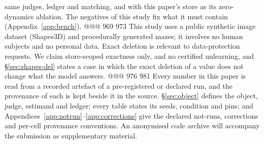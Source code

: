 same judges, ledger and matching, and with this paper's store as its zero-dynamics ablation. The
negatives of this study fix what it must contain (Appendix~\ref{app:bench}).
@@@ 969 973
This study uses a public synthetic image dataset (Shapes3D) and procedurally generated mazes; it
involves no human subjects and no personal data. Exact deletion is relevant to data-protection
requests. We claim store-scoped exactness only, and no certified unlearning, and
\S\ref{sec:shapes-del} states a case in which the exact deletion of a value does not change what
the model answers.
@@@ 976 981
Every number in this paper is read from a recorded artefact of a pre-registered or declared run,
and the provenance of each is kept beside it in the source. \S\ref{sec:object} defines the
object, judge, estimand and ledger; every table states its seeds, condition and pins; and
Appendices~\ref{app:notrun}--\ref{app:corrections} give the declared not-runs, corrections and
per-cell provenance conventions. An anonymised code archive will accompany the submission as
supplementary material. 
